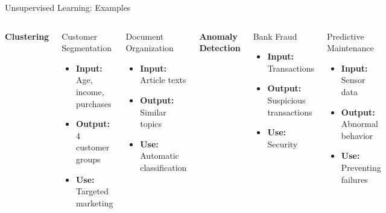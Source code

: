 \documentclass[12pt,aspectratio=169]{beamer}
\begin{document}
\begin{frame}{Unsupervised Learning: Examples}
\vspace{-25}
\begin{columns}[T]
\begin{center}
\large\textbf{Clustering}
\end{center}

\begin{exampleblock}{Customer Segmentation}
\small
\begin{itemize}
\item \textbf{Input:} Age, income, purchases
\item \textbf{Output:} 4 customer groups
\item \textbf{Use:} Targeted marketing
\end{itemize}
\end{exampleblock}

\begin{exampleblock}{Document Organization}
\small
\begin{itemize}
\item \textbf{Input:} Article texts
\item \textbf{Output:} Similar topics
\item \textbf{Use:} Automatic classification
\end{itemize}
\end{exampleblock}

\begin{center}
\large\textbf{Anomaly Detection}
\end{center}


\begin{exampleblock}{Bank Fraud}
\small
\begin{itemize}
\item \textbf{Input:} Transactions
\item \textbf{Output:} Suspicious transactions
\item \textbf{Use:} Security
\end{itemize}
\end{exampleblock}

\begin{exampleblock}{Predictive Maintenance}
\small
\begin{itemize}
\item \textbf{Input:} Sensor data
\item \textbf{Output:} Abnormal behavior
\item \textbf{Use:} Preventing failures
\end{itemize}
\end{exampleblock}

\end{columns}
\end{frame}
\end{document}
